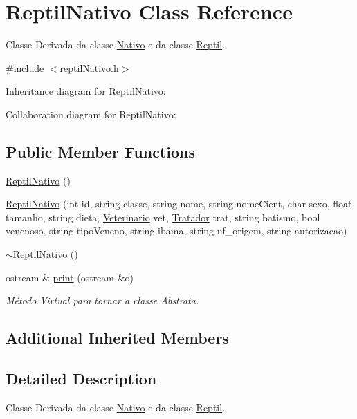 \hypertarget{classReptilNativo}{}\section{Reptil\+Nativo Class Reference}
\label{classReptilNativo}


Classe Derivada da classe \hyperlink{classNativo}{Nativo} e da classe \hyperlink{classReptil}{Reptil}.  




{\ttfamily \#include $<$reptil\+Nativo.\+h$>$}



Inheritance diagram for Reptil\+Nativo\+:


Collaboration diagram for Reptil\+Nativo\+:
\subsection*{Public Member Functions}
\begin{DoxyCompactItemize}
\item 
\hyperlink{classReptilNativo_a584bba0a356b2b3b961098541951fcbd}{Reptil\+Nativo} ()
\item 
\hyperlink{classReptilNativo_a7469ab318b42782764e4ff01009081e8}{Reptil\+Nativo} (int id, string classe, string nome, string nome\+Cient, char sexo, float tamanho, string dieta, \hyperlink{classVeterinario}{Veterinario} vet, \hyperlink{classTratador}{Tratador} trat, string batismo, bool venenoso, string tipo\+Veneno, string ibama, string uf\+\_\+origem, string autorizacao)
\item 
\hyperlink{classReptilNativo_a6de5838fd62a1c61175e690110cd7dc0}{$\sim$\+Reptil\+Nativo} ()
\item 
ostream \& \hyperlink{classReptilNativo_ae44fd929f6ca100781d7304802865203}{print} (ostream \&o)
\begin{DoxyCompactList}\small\item\em Método Virtual para tornar a classe Abstrata. \end{DoxyCompactList}\end{DoxyCompactItemize}
\subsection*{Additional Inherited Members}


\subsection{Detailed Description}
Classe Derivada da classe \hyperlink{classNativo}{Nativo} e da classe \hyperlink{classReptil}{Reptil}. 

